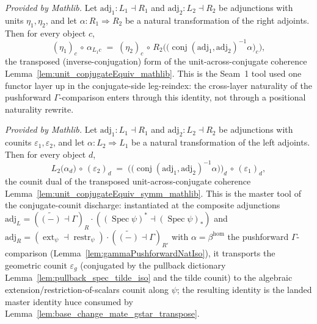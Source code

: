 \begin{lemma}
  \label{lem:unit_conjugateEquiv_symm_mathlib}
  \mathlibok
  \textit{Provided by Mathlib.}
  Let \(\mathrm{adj}_1 : L_1 \dashv R_1\) and \(\mathrm{adj}_2 : L_2 \dashv R_2\) be adjunctions with
  units \(\eta_1,\eta_2\), and let \(\alpha : R_1 \Rightarrow R_2\) be a natural transformation of the
  right adjoints. Then for every object \(c\),
  \[
    (\eta_1)_c \,\circ\, \alpha_{L_1 c}
      \;=\; (\eta_2)_c \,\circ\, R_2\bigl(\bigl(\operatorname{conj}(\mathrm{adj}_1,\mathrm{adj}_2)^{-1}\alpha\bigr)_c\bigr),
  \]
  the transposed (inverse-conjugation) form of the unit-across-conjugate coherence
  Lemma~\ref{lem:unit_conjugateEquiv_mathlib}. This is the Seam~1 tool used one functor layer up in the
  conjugate-side leg-reindex: the cross-layer naturality of the pushforward \(\Gamma\)-comparison enters
  through this identity, not through a positional naturality rewrite.
\end{lemma}

\begin{lemma}
  \label{lem:conjugateEquiv_counit_symm_mathlib}
  \mathlibok
  \textit{Provided by Mathlib.}
  Let \(\mathrm{adj}_1 : L_1 \dashv R_1\) and \(\mathrm{adj}_2 : L_2 \dashv R_2\) be adjunctions with
  counits \(\varepsilon_1,\varepsilon_2\), and let \(\alpha : L_2 \Rightarrow L_1\) be a natural
  transformation of the left adjoints. Then for every object \(d\),
  \[
    L_2\bigl(\alpha_d\bigr) \,\circ\, (\varepsilon_2)_d
      \;=\; \bigl(\bigl(\operatorname{conj}(\mathrm{adj}_1,\mathrm{adj}_2)^{-1}\alpha\bigr)\bigr)_d
        \,\circ\, (\varepsilon_1)_d ,
  \]
  the counit dual of the transposed unit-across-conjugate coherence
  Lemma~\ref{lem:unit_conjugateEquiv_symm_mathlib}. This is the master tool of the conjugate-counit
  discharge: instantiated at the composite adjunctions
  \(\mathrm{adj}_L = (\widetilde{(-)} \dashv \Gamma)_R \cdot ((\operatorname{Spec}\psi)^* \dashv
  (\operatorname{Spec}\psi)_*)\) and
  \(\mathrm{adj}_R = (\operatorname{ext}_\psi \dashv \operatorname{restr}_\psi) \cdot
  (\widetilde{(-)} \dashv \Gamma)_{R'}\) with \(\alpha = \beta^{\mathrm{hom}}\) the pushforward
  \(\Gamma\)-comparison (Lemma~\ref{lem:gammaPushforwardNatIso}), it transports the geometric counit
  \(\varepsilon_g\) (conjugated by the pullback dictionary
  Lemma~\ref{lem:pullback_spec_tilde_iso} and the tilde counit) to the algebraic
  extension/restriction-of-scalars counit along \(\psi\); the resulting identity is the landed master
  identity \(\mathrm{huce}\) consumed by Lemma~\ref{lem:base_change_mate_gstar_transpose}.
\end{lemma}

